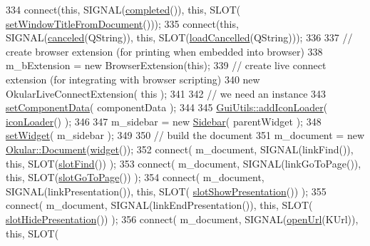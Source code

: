 \begin{DoxyCode}
{334     connect(\textcolor{keyword}{this}, SIGNAL(\hyperlink{classKParts_1_1ReadOnlyPart_a7dbe7a0dd64ed631d7d7fc763167de31}{completed}()), \textcolor{keyword}{this}, SLOT(
      \hyperlink{classOkular_1_1Part_afb7d48e69af54832180de532dcb40075}{setWindowTitleFromDocument}()));
335     connect(\textcolor{keyword}{this}, SIGNAL(\hyperlink{classKParts_1_1ReadOnlyPart_ab1083f7c30e868d66e1f326b94851d8c}{canceled}(QString)), \textcolor{keyword}{this}, SLOT(\hyperlink{classOkular_1_1Part_a50ed41cb584b4688ce82139dd28c9bf3}{loadCancelled}(QString)));
336 
337     \textcolor{comment}{// create browser extension (for printing when embedded into browser)}
338     m\_bExtension = \textcolor{keyword}{new} BrowserExtension(\textcolor{keyword}{this});
339     \textcolor{comment}{// create live connect extension (for integrating with browser scripting)}
340     \textcolor{keyword}{new} OkularLiveConnectExtension( \textcolor{keyword}{this} );
341 
342     \textcolor{comment}{// we need an instance}
343     \hyperlink{classKParts_1_1PartBase_a5542df2a60d5ed1882bf31ac89d9a8fe}{setComponentData}( componentData );
344 
345     \hyperlink{namespaceGuiUtils_a72fd83c2762e1f347bb81b65b4094409}{GuiUtils::addIconLoader}( \hyperlink{classKParts_1_1Part_a8c41d16009e44a35ec3b7c5e6b4e0b80}{iconLoader}() );
346 
347     m\_sidebar = \textcolor{keyword}{new} \hyperlink{classSidebar}{Sidebar}( parentWidget );
348     \hyperlink{classKParts_1_1Part_a7578836b79ed97019b42f2d2fc03082d}{setWidget}( m\_sidebar );
349 
350     \textcolor{comment}{// build the document}
351     m\_document = \textcolor{keyword}{new} \hyperlink{classOkular_1_1Document}{Okular::Document}(\hyperlink{classKParts_1_1Part_a134900cb0605a1cd5113d90954a01fdf}{widget}());
352     connect( m\_document, SIGNAL(linkFind()), \textcolor{keyword}{this}, SLOT(\hyperlink{classOkular_1_1Part_af99fda5f9bade72bfc20fd8165974da5}{slotFind}()) );
353     connect( m\_document, SIGNAL(linkGoToPage()), \textcolor{keyword}{this}, SLOT(\hyperlink{classOkular_1_1Part_aa073366bcac831a276e4cded2c9af057}{slotGoToPage}()) );
354     connect( m\_document, SIGNAL(linkPresentation()), \textcolor{keyword}{this}, SLOT(
      \hyperlink{classOkular_1_1Part_a1c9208bc02c4ef8e8e66a5f34b1a4465}{slotShowPresentation}()) );
355     connect( m\_document, SIGNAL(linkEndPresentation()), \textcolor{keyword}{this}, SLOT(
      \hyperlink{classOkular_1_1Part_a5144c0676e583a84410c106dca86f1e6}{slotHidePresentation}()) );
356     connect( m\_document, SIGNAL(\hyperlink{classOkular_1_1Part_af2a25b12165df885a959622966c2a852}{openUrl}(KUrl)), \textcolor{keyword}{this}, SLOT(
}
\end{DoxyCode}
